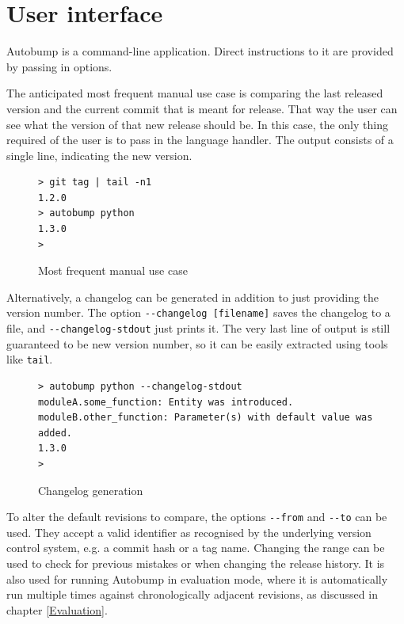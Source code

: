 \documentclass{l4proj}
\newcommand\genericstyle{\lstset{basicstyle=\ttm}}
\newcommand\codeinline[1]{{\genericstyle\lstinline!#1!}}
\begin{document}
\section{User interface}

Autobump is a command-line application. Direct instructions to it are
provided by passing in options.

The anticipated most frequent manual use case is comparing the last
released version and the current commit that is meant for release.
That way the user can see what the version of that new release should
be. In this case, the only thing required of the user is to pass in
the language handler. The output consists of a single line, indicating
the new version.

\begin{figure}[H]
\centering
\caption{Most frequent manual use case}
\begin{BVerbatim}
> git tag | tail -n1
1.2.0
> autobump python
1.3.0
>
\end{BVerbatim}
\end{figure}

Alternatively, a changelog can be generated in addition to just
providing the version number. The option \codeinline{--changelog
[filename]} saves the changelog to a file, and
\codeinline{--changelog-stdout} just prints it. The very last line of
output is still guaranteed to be new version number, so it can be
easily extracted using tools like \codeinline{tail}.

\begin{figure}[H]
\centering
\caption{Changelog generation}
\begin{BVerbatim}
> autobump python --changelog-stdout
moduleA.some_function: Entity was introduced.
moduleB.other_function: Parameter(s) with default value was added.
1.3.0
>
\end{BVerbatim}
\end{figure}

To alter the default revisions to compare, the options
\codeinline{--from} and \codeinline{--to} can be used. They accept a
valid identifier as recognised by the underlying version control
system, e.g. a commit hash or a tag name. Changing the range can be
used to check for previous mistakes or when changing the release
history. It is also used for running Autobump in evaluation mode,
where it is automatically run multiple times against chronologically
adjacent revisions, as discussed in chapter \ref{Evaluation}.
\end{document}
